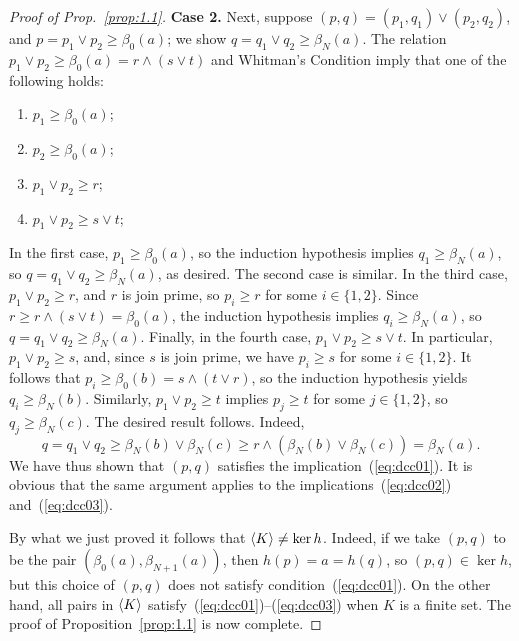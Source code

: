 \begin{proof}[Proof of Prop.~\ref{prop:1.1}]
    \medskip
    \noindent \textbf{Case 2.}
    Next, 
    suppose $(p,q) = (p_1, q_1) \vee (p_2, q_2)$, and
    $p = p_1\vee p_2 \geq \beta_0(a)$; we show 
    $q = q_1 \vee q_2 \geq \beta_N(a)$. 
    The relation $p_1\vee p_2 \geq \beta_0(a) = r \wedge (s \vee t)$ and
    Whitman's Condition imply that one of the following holds:
    \begin{enumerate}
      \item   $p_1\geq \beta_0(a)$;  
      \item   $p_2\geq \beta_0(a)$;  
      \item   $p_1\vee p_2 \geq r$;  
      \item   $p_1\vee p_2 \geq s \vee t$;  
    \end{enumerate}
    In the first case, $p_1 \geq \beta_0(a)$, so
    the induction hypothesis implies $q_1\geq \beta_N(a)$, so 
    $q = q_1\vee q_2\geq \beta_N(a)$, as desired.  
    The second case is similar.
    In the third case, $p_1 \vee p_2 \geq r$, and $r$ is join prime, so 
    $p_i \geq r$ for some $i\in \{1,2\}$.  Since $r\geq r \wedge (s\vee t) = \beta_0(a)$, 
    the induction hypothesis implies $q_i \geq \beta_N(a)$, 
    so $q = q_1\vee q_2\geq \beta_N(a)$.
    Finally, in the fourth case, $p_1\vee p_2 \geq s \vee t$. 
    In particular, $p_1\vee p_2 \geq s$, and, since $s$ is join prime,
    we have $p_i\geq s$ for some $i\in \{1,2\}$.  
    It follows that $p_i \geq \beta_0(b) = s\wedge (t\vee r)$, so the induction hypothesis
    yields $q_i \geq \beta_N(b)$.
    Similarly, $p_1\vee p_2 \geq t$ implies 
    $p_j\geq t$ for some $j\in \{1,2\}$, so $q_j \geq \beta_N(c)$.
    The desired result follows.  Indeed,
    \[
    q = q_1\vee q_2 \geq \beta_N(b) \vee \beta_N(c) 
    \geq r \wedge (\beta_N(b)\vee \beta_N(c)) = \beta_N(a).
    \]                   
    We have thus shown that $(p,q)$ satisfies the implication~(\ref{eq:dcc01}).
    It is obvious that the same argument applies to the 
    implications~(\ref{eq:dcc02}) and~(\ref{eq:dcc03}).
  
    \medskip
  By what we just proved it follows that 
  $\langle K\rangle \neq \ker h$. Indeed, if we take $(p, q)$ to be 
  the pair $(\beta_0(a), \beta_{N+1}(a))$, then  $h(p) = a = h(q)$, 
  so $(p,q) \in \ker h$, but this choice of $(p,q)$ does not satisfy 
  condition~(\ref{eq:dcc01}). On 
  the other hand, all pairs in $\langle K\rangle$ 
  satisfy~(\ref{eq:dcc01})--(\ref{eq:dcc03}) when $K$ is a finite set.   The 
  proof of Proposition~\ref{prop:1.1} is now complete.
\end{proof}

